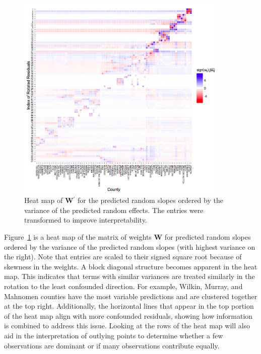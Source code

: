 \documentclass[11pt]{article} %
\newcommand{\trans}{\ensuremath{^\prime}}
\begin{document}
\begin{figure}[htb]
\centering
	\includegraphics[width=0.9\textwidth]{tmslope-image.png}
	\caption{\label{fig:matimage} Heat map of $\bm{W}\trans$ for the predicted random slopes ordered by the variance of the predicted random effects. The entries were transformed to improve interpretability.
	}
	
\end{figure}

Figure~\ref{fig:matimage} is a heat map of the  matrix of weights $\bm{W}$ for predicted random slopes  ordered by the variance of the predicted random slopes (with highest variance on the right).  Note that entries are scaled to their signed square root because of skewness in the weights. A block diagonal structure becomes apparent  in the heat map. This indicates  that terms with similar variances are treated similarly in the rotation to the least confounded direction. For example, Wilkin, Murray, and Mahnomen counties have the most variable predictions and are clustered together at the top right. Additionally, the horizontal lines that appear in the top portion of the heat map align with more confounded residuals, showing how information is combined to address this issue. Looking at the rows of the heat map will also aid in the interpretation of outlying points to determine whether a few observations are dominant or if many observations contribute equally.
\end{document}
